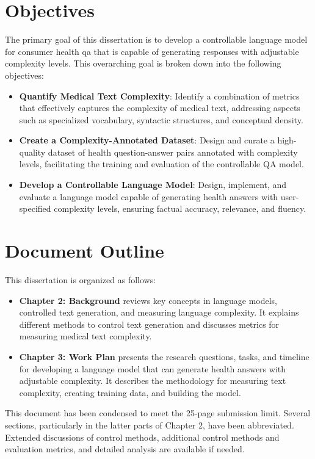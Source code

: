 \section{Objectives}

The primary goal of this dissertation is to develop a controllable language model for consumer health \gls{qa} that is capable of generating responses with adjustable complexity levels. This overarching goal is broken down into the following objectives:
\begin{itemize}
    \item \textbf{Quantify Medical Text Complexity}: Identify a combination of metrics that effectively captures the complexity of medical text, addressing aspects such as specialized vocabulary, syntactic structures, and conceptual density.
    \item \textbf{Create a Complexity-Annotated Dataset}: Design and curate a high-quality dataset of health question-answer pairs annotated with complexity levels, facilitating the training and evaluation of the controllable QA model.
    \item \textbf{Develop a Controllable Language Model}: Design, implement, and evaluate a language model capable of generating health answers with user-specified complexity levels, ensuring factual accuracy, relevance, and fluency.
\end{itemize}

\section{Document Outline}

This dissertation is organized as follows:
\begin{itemize}
\item \textbf{Chapter 2: Background} reviews key concepts in language models, controlled text generation, and measuring language complexity. It explains different methods to control text generation and discusses metrics for measuring medical text complexity.
\item \textbf{Chapter 3: Work Plan} presents the research questions, tasks, and timeline for developing a language model that can generate health answers with adjustable complexity. It describes the methodology for measuring text complexity, creating training data, and building the model.
\end{itemize}

\vspace{1cm}

\begin{tcolorbox}[colback=gray!5,colframe=gray!40,title=Note on Document Length]
    This document has been condensed to meet the 25-page submission limit. Several sections, particularly in the latter parts of Chapter 2, have been abbreviated. Extended discussions of control methods, additional control methods and evaluation metrics, and detailed analysis are available if needed.
\end{tcolorbox}